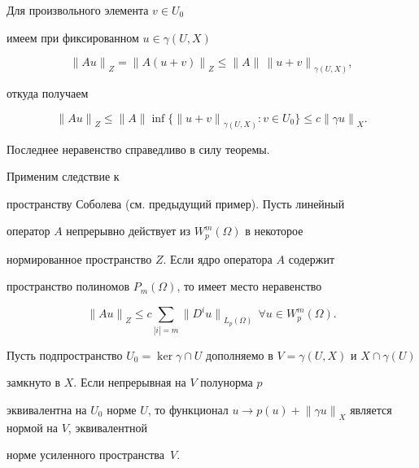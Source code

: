\begin{pf}


Для произвольного элемента $v \in U_0$


имеем при фиксированном $u \in \gamma(U,X)$


$$


{\|Au\|}_Z={\|A(u+v)\|}_Z \le \|A\|\, {\|u+v\|}_{\gamma(U,X)},


$$


откуда получаем


$$


{\|Au\|}_Z \le \|A\| \inf \{ {\|u+v\|}_{\gamma(U,X)} : v \in


U_0 \} \le c {\|\gamma u\|}_X.


$$


Последнее неравенство справедливо в силу теоремы.


\end{pf}





\begin{examnonum}


Применим следствие к


пространству Соболева (см. предыдущий пример). Пусть линейный


оператор $A$ непрерывно действует из $W^m_p(\Omega)$ в некоторое


нормированное пространство $Z$. Если ядро оператора $A$ содержит


пространство полиномов $P_m(\Omega)$, то имеет место неравенство


$$


{\|Au\|}_Z \le c \sum_{|i|=m} {\|D^i u\|}_{L_p(\Omega)}


\ \ \forall u \in W^m_p(\Omega).


$$


\end{examnonum}





\begin{thms} \label{renorm}


Пусть подпространство $U_0 =


\ker \gamma \cap U$ дополняемо в $V=\gamma(U,X)$ и $X \cap \gamma(U)$


замкнуто в $X$. Если непрерывная на $V$ полунорма $p$


эквивалентна на $U_0$ норме $U$, то функционал $u \to


p(u)+{\|\gamma u \|}_X$ является нормой на $V$, эквивалентной


норме усиленного пространства~$V$.


\end{thms}





